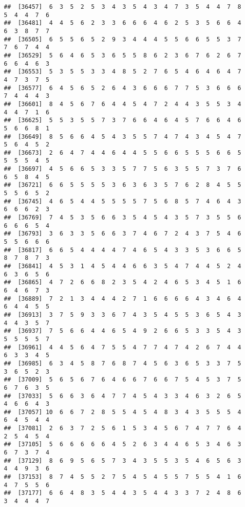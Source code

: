 \documentclass[
]{book}
\begin{document}
\begin{verbatim}
##  [36457]  6  3  5  2  5  3  4  3  5  4  3  4  7  3  5  4  4  7  8  5  4  4  7  6
##  [36481]  4  4  5  6  2  3  3  6  6  6  4  6  2  5  3  5  6  6  4  6  3  8  7  7
##  [36505]  6  5  5  6  5  2  9  3  4  4  4  5  5  6  6  5  5  3  7  7  6  7  4  4
##  [36529]  5  6  4  6  5  3  6  5  5  8  6  2  3  6  7  6  2  6  7  6  6  4  6  3
##  [36553]  5  3  5  5  3  3  4  8  5  2  7  6  5  4  6  4  6  4  7  4  7  3  7  5
##  [36577]  6  4  5  6  5  2  6  4  3  6  6  6  7  7  5  3  6  6  6  7  4  4  4  3
##  [36601]  8  4  5  6  7  6  4  4  5  4  7  2  4  4  3  5  5  3  4  4  4  7  1  6
##  [36625]  5  5  3  5  5  7  3  7  6  6  4  6  4  5  7  6  6  4  6  5  6  6  8  1
##  [36649]  8  5  6  6  4  5  4  3  5  5  7  4  7  4  3  4  5  4  7  5  6  4  5  2
##  [36673]  2  6  4  7  4  4  6  4  4  5  5  6  6  5  5  5  6  6  5  5  5  5  4  5
##  [36697]  4  5  6  6  5  3  3  5  7  7  5  6  3  5  5  7  3  7  6  6  5  8  4  5
##  [36721]  6  6  5  5  5  5  3  6  3  6  3  5  7  6  2  8  4  5  5  5  5  6  5  2
##  [36745]  4  6  5  4  4  5  5  5  5  7  5  6  8  5  7  4  6  4  3  6  6  6  2  3
##  [36769]  7  4  5  3  5  6  6  3  5  4  5  4  3  5  7  3  5  5  6  6  6  6  5  4
##  [36793]  3  6  3  3  5  6  6  3  7  4  6  7  2  4  3  7  5  4  6  5  5  6  6  6
##  [36817]  6  6  5  4  4  4  4  7  4  6  5  4  3  3  5  3  6  6  5  8  7  8  7  3
##  [36841]  4  5  3  1  4  5  4  4  6  6  3  5  4  7  4  4  5  2  4  6  3  6  5  6
##  [36865]  4  7  2  6  6  8  2  3  5  4  2  4  6  5  3  4  5  1  6  6  4  6  7  3
##  [36889]  7  2  1  3  4  4  4  2  7  1  6  6  6  6  4  3  4  6  4  6  4  4  5  5
##  [36913]  3  7  5  9  3  3  6  7  4  3  5  4  5  5  3  6  5  4  3  4  4  3  5  7
##  [36937]  7  5  6  6  4  4  6  5  4  9  2  6  6  5  3  3  5  4  3  5  5  5  5  7
##  [36961]  4  4  5  6  4  7  5  5  4  7  7  4  7  4  2  6  7  4  4  6  3  3  4  5
##  [36985]  6  3  4  5  8  7  6  8  7  4  5  6  3  6  5  3  3  7  5  3  6  5  2  3
##  [37009]  5  6  5  6  7  6  4  6  6  7  6  6  7  5  4  5  3  7  5  6  7  6  3  5
##  [37033]  5  6  6  3  6  4  7  7  4  5  4  3  3  4  6  3  2  6  5  4  6  6  4  3
##  [37057] 10  6  6  7  2  8  5  5  4  5  4  8  3  4  3  5  5  5  4  6  4  5  4  4
##  [37081]  2  6  3  7  2  5  6  1  5  3  4  5  6  7  4  7  7  6  4  2  5  4  5  4
##  [37105]  5  6  6  6  6  6  4  5  2  6  3  4  4  6  5  3  4  6  3  6  7  3  7  4
##  [37129]  8  6  9  5  6  5  7  3  4  3  5  5  3  5  4  6  5  6  3  4  4  9  3  6
##  [37153]  8  7  4  5  5  2  7  5  4  5  4  5  5  7  5  5  4  1  6  4  7  5  5  6
##  [37177]  6  6  4  8  3  5  4  4  3  5  4  4  3  3  7  2  4  8  6  3  4  4  4  7

\end{verbatim}
\end{document}
